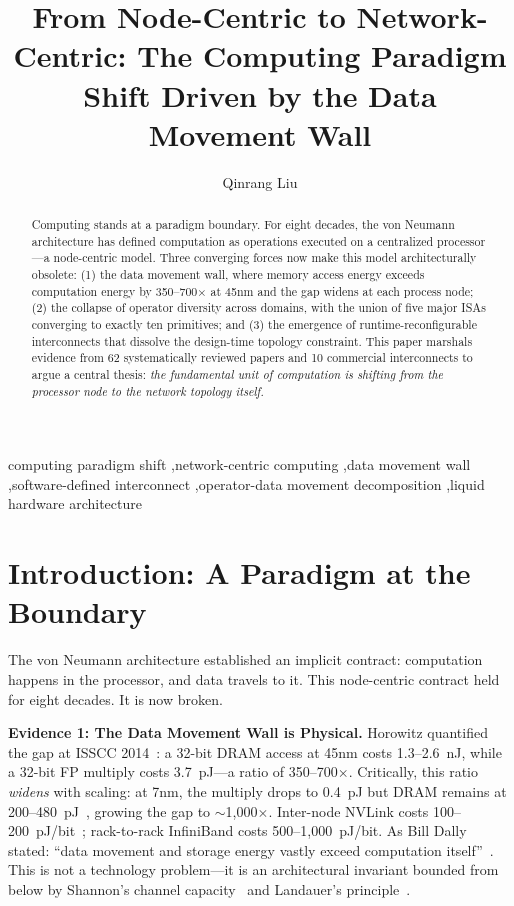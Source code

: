 ﻿\documentclass[review,3p,twocolumn]{elsarticle}
\begin{document}
\begin{frontmatter}
\title{From Node-Centric to Network-Centric: The Computing Paradigm Shift Driven by the Data Movement Wall}
\author[1]{Qinrang Liu}
\address[1]{TCC iNEST Research Group, Tianjin University, Tianjin 300072, China}
\begin{abstract}
Computing stands at a paradigm boundary. For eight decades, the von Neumann architecture has defined computation as operations executed on a centralized processor---a node-centric model. Three converging forces now make this model architecturally obsolete: (1) the data movement wall, where memory access energy exceeds computation energy by 350--700$\times$ at 45nm and the gap widens at each process node; (2) the collapse of operator diversity across domains, with the union of five major ISAs converging to exactly ten primitives; and (3) the emergence of runtime-reconfigurable interconnects that dissolve the design-time topology constraint. This paper marshals evidence from 62 systematically reviewed papers and 10 commercial interconnects to argue a central thesis: \emph{the fundamental unit of computation is shifting from the processor node to the network topology itself.}
\end{abstract}
\begin{keyword}
computing paradigm shift \sep network-centric computing \sep data movement wall \sep software-defined interconnect \sep operator-data movement decomposition \sep liquid hardware architecture
\end{keyword}
\end{frontmatter}

\section{Introduction: A Paradigm at the Boundary}
\label{sec:intro}

The von Neumann architecture established an implicit contract: computation happens in the processor, and data travels to it. This node-centric contract held for eight decades. It is now broken.

\textbf{Evidence 1: The Data Movement Wall is Physical.} Horowitz quantified the gap at ISSCC 2014~\cite{horowitz2014}: a 32-bit DRAM access at 45nm costs 1.3--2.6~nJ, while a 32-bit FP multiply costs 3.7~pJ---a ratio of 350--700$\times$. Critically, this ratio \emph{widens} with scaling: at 7nm, the multiply drops to 0.4~pJ but DRAM remains at 200--480~pJ~\cite{dally2023}, growing the gap to $\sim$1,000$\times$. Inter-node NVLink costs 100--200~pJ/bit~\cite{nvidia2025}; rack-to-rack InfiniBand costs 500--1,000~pJ/bit. As Bill Dally stated: ``data movement and storage energy vastly exceed computation itself''~\cite{dally2023}. This is not a technology problem---it is an architectural invariant bounded from below by Shannon's channel capacity~\cite{shannon1948} and Landauer's principle~\cite{landauer1961,berut2012}.
\end{document}
